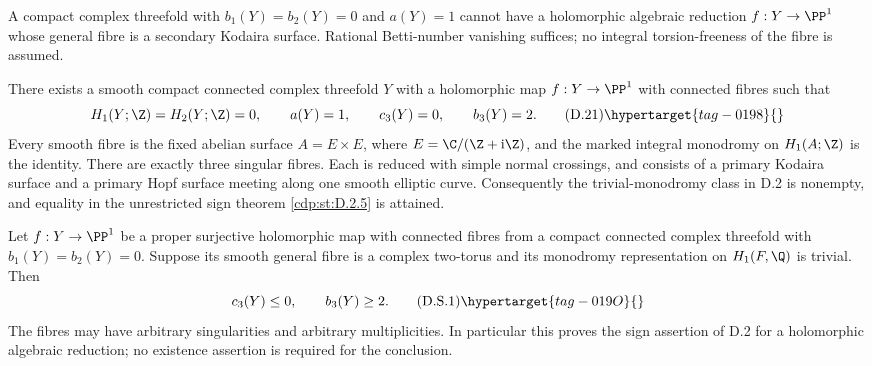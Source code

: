 \begin{proposition}\hypertarget{tag-01FF}{}\label{cdp:st:C.3.9}



A compact complex threefold with $b_1(Y)=b_2(Y)=0$ and
$a(Y)=1$ cannot have a holomorphic algebraic reduction
$f:Y\to\PP^1$ whose general fibre is a secondary Kodaira
surface. Rational Betti-number vanishing suffices; no integral
torsion-freeness of the fibre is assumed.
\end{proposition}

\begin{proposition}\hypertarget{tag-01GE}{}\label{cdp:st:D.2.7}



There exists a smooth compact connected complex threefold $Y$
with a holomorphic map $f:Y\to\PP^1$ with connected fibres such
that
\[
 H_1(Y;\Z)=H_2(Y;\Z)=0,\qquad
 a(Y)=1,\qquad c_3(Y)=0,\qquad b_3(Y)=2.
\tag{D.21}\hypertarget{tag-0198}{}\label{cdp:eq:D.21}
\]
Every smooth fibre is the fixed abelian surface
$A=E\times E$, where $E=\C/(\Z+\mathrm i\Z)$, and the marked
integral monodromy on $H_1(A;\Z)$ is the identity. There are
exactly three singular fibres. Each is reduced with simple
normal crossings, and consists of a primary Kodaira surface
and a primary Hopf surface meeting along one smooth elliptic
curve. Consequently the trivial-monodromy class in D.2 is
nonempty, and equality in the unrestricted sign theorem
\ref{cdp:st:D.2.5} is attained.
\end{proposition}

\begin{proposition}\hypertarget{tag-01GC}{}\label{cdp:st:D.2.5}



Let $f:Y\to\PP^1$ be a proper surjective holomorphic map with
connected fibres from a compact connected complex threefold with
$b_1(Y)=b_2(Y)=0$. Suppose its smooth general fibre is a complex
two-torus and its monodromy representation on $H_1(F,\Q)$ is
trivial. Then
\[
 c_3(Y)\le0,\qquad b_3(Y)\ge2.
 \tag{D.S.1}\hypertarget{tag-019O}{}\label{cdp:eq:D.S.1}
\]
The fibres may have arbitrary singularities and arbitrary
multiplicities. In particular this proves the sign assertion of
D.2 for a holomorphic algebraic reduction; no existence assertion
is required for the conclusion.
\end{proposition}

